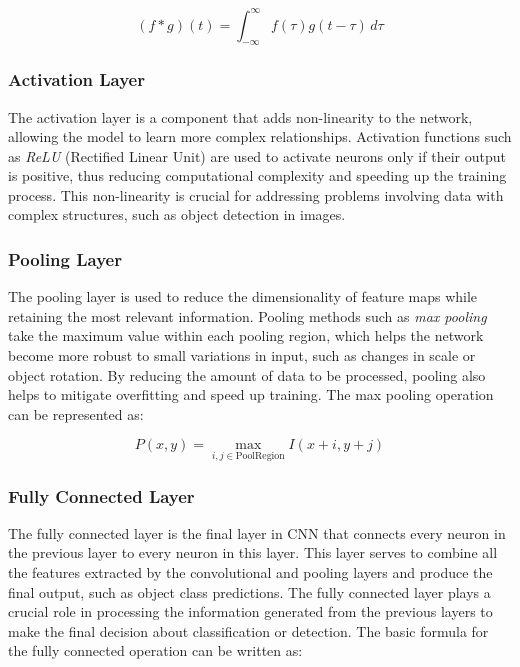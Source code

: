 \begin{equation}
  (f * g)(t) = \int_{-\infty}^{\infty} f(\tau)g(t - \tau) \, d\tau
\end{equation}

\subsubsection{Activation Layer}
\label{subsubsec:Activation Layer}

The activation layer is a component that adds non-linearity to the network, allowing the model to learn more complex relationships. Activation functions such as \emph{ReLU} (Rectified Linear Unit) are used to activate neurons only if their output is positive, thus reducing computational complexity and speeding up the training process. This non-linearity is crucial for addressing problems involving data with complex structures, such as object detection in images.

\subsubsection{Pooling Layer}
\label{subsubsec:Pooling Layer}

The pooling layer is used to reduce the dimensionality of feature maps while retaining the most relevant information. Pooling methods such as \emph{max pooling} take the maximum value within each pooling region, which helps the network become more robust to small variations in input, such as changes in scale or object rotation. By reducing the amount of data to be processed, pooling also helps to mitigate overfitting and speed up training. The max pooling operation can be represented as:

\begin{equation}
  P(x, y) = \max_{i,j \in \mathrm{PoolRegion}} I(x+i, y+j)
\end{equation}

\subsubsection{Fully Connected Layer}
\label{subsubsec:Fully Connected Layer}

The fully connected layer is the final layer in CNN that connects every neuron in the previous layer to every neuron in this layer. This layer serves to combine all the features extracted by the convolutional and pooling layers and produce the final output, such as object class predictions. The fully connected layer plays a crucial role in processing the information generated from the previous layers to make the final decision about classification or detection. The basic formula for the fully connected operation can be written as:

